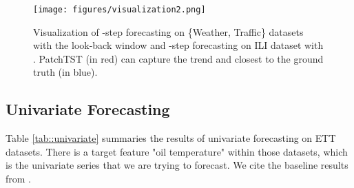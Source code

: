 \documentclass{article} \usepackage{iclr2023_conference,times}
\begin{document}
\begin{figure}[!htbp]
\begin{center}
\texttt{[image: figures/visualization2.png]}
\end{center}
\caption{Visualization of -step forecasting on \{Weather, Traffic\} datasets with the look-back window  and -step forecasting on ILI dataset with . PatchTST (in red) can capture the trend and closest to the ground truth (in blue).}
\label{fig::visual}
\end{figure}

\subsection{Univariate Forecasting}
\label{append:uni}

Table \ref{tab::univariate} summaries the results of univariate forecasting on ETT datasets. There is a target feature "oil temperature" within those datasets, which is the univariate series that we are trying to forecast. We cite the baseline results from \citep{dlinear}.
\end{document}
